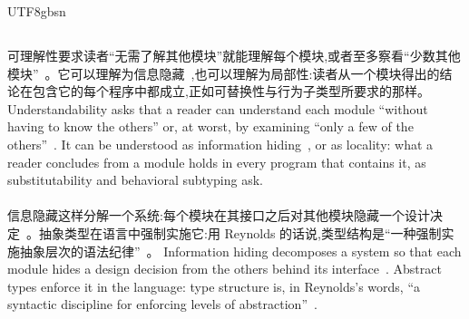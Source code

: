 \begin{CJK*}{UTF8}{gbsn}
\subsection{}
\label{sec:prior-understandability}
\ifPaperChinese
可理解性要求读者``无需了解其他模块''就能理解每个模块,或者至多察看``少数其他模块''~\cite[第~43~页]{meyer1997-object-oriented-software-construction}。它可以理解为信息隐藏~\cite{parnas1972-criteria-decomposing-modules},也可以理解为局部性:读者从一个模块得出的结论在包含它的每个程序中都成立,正如可替换性与行为子类型所要求的那样。
\else
Understandability asks that a reader can understand each module ``without having to know the others''
or, at worst, by examining ``only a few of the
others''~\cite[p.~43]{meyer1997-object-oriented-software-construction}.
It can be understood as information hiding~\cite{parnas1972-criteria-decomposing-modules}, or as
locality: what a reader concludes from a module holds in every program that contains it, as
substitutability and behavioral subtyping ask.
\fi

\paragraph{}
\ifPaperChinese
信息隐藏这样分解一个系统:每个模块在其接口之后对其他模块隐藏一个设计决定~\cite{parnas1972-criteria-decomposing-modules}。抽象类型在语言中强制实施它:用 Reynolds 的话说,类型结构是``一种强制实施抽象层次的语法纪律''~\cite[第~513~页]{reynolds1983-parametric-polymorphism}。
\else
Information hiding decomposes a system so that each module hides a design decision from the others
behind its interface~\cite{parnas1972-criteria-decomposing-modules}.
Abstract types enforce it in the language: type structure is, in Reynolds's words, ``a syntactic
discipline for enforcing levels of abstraction''~\cite[p.~513]{reynolds1983-parametric-polymorphism}.
\fi


\end{CJK*}
